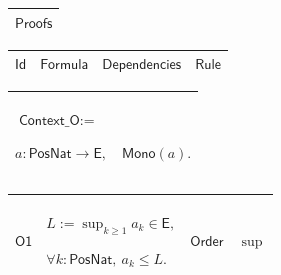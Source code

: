 \documentclass[11pt]{amsart}
\renewcommand{\arraystretch}{1.4}
\newlength{\FTCOneColumnBody}
\newlength{\FTCFourColumnBody}
\begin{document}
{\centering
\renewcommand{\arraystretch}{1.4}
\par\setlength{\parskip}{0pt}\nointerlineskip
\noindent
\begin{tabular}{|@{}>{\centering\arraybackslash}m{\FTCOneColumnBody}|}\hline
$\displaystyle \textsf{Proofs}$\\ \hline
\end{tabular}%
\par\setlength{\parskip}{0pt}\nointerlineskip
\noindent
\begin{tabular}{|@{}>{\centering\arraybackslash}m{0.078431\FTCFourColumnBody}|>{\centering\arraybackslash}m{0.535947\FTCFourColumnBody}|>{\centering\arraybackslash}m{0.281045\FTCFourColumnBody}|>{\centering\arraybackslash}m{0.104575\FTCFourColumnBody}|}\hline
$\displaystyle \textsf{Id}$ & $\displaystyle \textsf{Formula}$ & $\displaystyle \textsf{Dependencies}$ & $\displaystyle \textsf{Rule}$\\ \hline
\end{tabular}%
\par\setlength{\parskip}{0pt}\nointerlineskip
\noindent
\begin{tabular}{|@{}>{\centering\arraybackslash}m{\FTCOneColumnBody}|}\hline
$\displaystyle \textsf{Context\_O}:=$\par
$\displaystyle a:\textsf{PosNat}\to\textsf{E},\quad\textsf{Mono}(a).$\\ \hline
\end{tabular}%
\par\setlength{\parskip}{0pt}\nointerlineskip
\noindent
\begin{tabular}{|@{}>{\centering\arraybackslash}m{0.078431\FTCFourColumnBody}|>{\centering\arraybackslash}m{0.535947\FTCFourColumnBody}|>{\centering\arraybackslash}m{0.281045\FTCFourColumnBody}|>{\centering\arraybackslash}m{0.104575\FTCFourColumnBody}|}\hline
\hypertarget{proof:O1}{$\displaystyle \textsf{O1}$} & $\displaystyle L:=\sup_{k\ge1}a_k\in\textsf{E},$\par
$\displaystyle \forall k:\textsf{PosNat},\ a_k\le L.$ & \hyperlink{ax:Order}{$\displaystyle \textsf{Order}$} & $\displaystyle \sup$\\ \hline
\end{tabular}%
\par\setlength{\parskip}{0pt}\nointerlineskip
\noindent
\begin{tabular}{|@{}>{\centering\arraybackslash}m{0.078431\FTCFourColumnBody}|>{\centering\arraybackslash}m{0.535947\FTCFourColumnBody}|>{\centering\arraybackslash}m{0.281045\FTCFourColumnBody}|>{\centering\arraybackslash}m{0.104575\FTCFourColumnBody}|}\hline

\end{tabular}}
\end{document}

